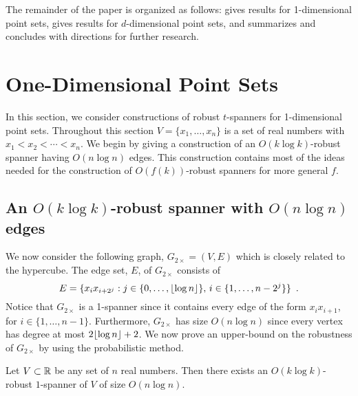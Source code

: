 \documentclass{patmorin}
\begin{document}
The remainder of the paper is organized as follows:  
gives results for 1-dimensional point sets,  gives results
for $d$-dimensional point sets, and  summarizes and
concludes with directions for further research.


\section{One-Dimensional Point Sets}

In this section, we consider constructions of robust $t$-spanners for
1-dimensional point sets.  Throughout this section $V=\{x_1,\ldots,x_n\}$
is a set of real numbers with $x_1<x_2<\cdots<x_n$.  We begin by giving
a construction of an $O(k\log k)$-robust spanner having $O(n\log n)$
edges.  This construction contains most of the ideas needed for the
construction of $O(f(k))$-robust spanners for more general $f$.

\subsection{An $O(k\log k)$-robust spanner with $O(n\log n)$ edges}

We now consider the following graph, $G_{2\times}=(V,E)$ which is
closely related to the hypercube.   The edge set, $E$, of $G_{2\times}$
consists of
\[
  E = \{x_ix_{i+2^j} : j\in\{0,\ldots,{\lfloor \log n \rfloor}\},\, 
        i\in\{1,\ldots,n-2^j\} \} \enspace .
\] 
Notice that $G_{2\times}$ is a 1-spanner since it contains every
edge of the form $x_ix_{i+1}$, for $i\in\{1,\ldots,n-1\}$. Furthermore,
$G_{2\times}$ has size $O(n\log n)$ since every vertex has degree at most
$2{\lfloor \log n \rfloor}+2$.  We now prove an upper-bound on the robustness of
$G_{2\times}$ by using the probabilistic method.

\begin{thm}
  Let $V\subset \mathbb{R}$ be any set of $n$ real numbers.  Then there exists
  an $O(k\log k)$-robust $1$-spanner of $V$ of size $O(n\log n)$.
\end{thm}
\end{document}
